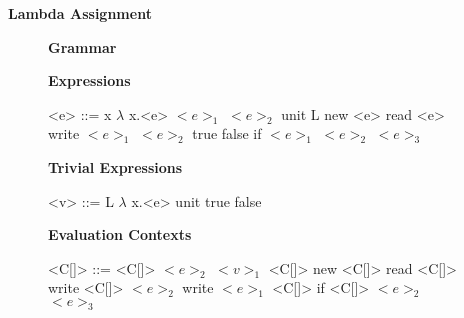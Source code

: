 \documentclass[11pt,oneside]{book}
\begin{document}
\frontmatter

\mainmatter

\pagebreak

\begin{center}
    {
        \bf
        \huge
        Lambda Assignment
    }
\end{center}

\begin{figure}[!hp]
\begin{center}
{
    \bf
    \huge
    Grammar
}
\end{center}


\setlength{\grammarindent}{10em} %

\setlength{\grammarparsep}{5pt} %

\textbf{Expressions}

\begin{grammar}

    <e> ::=  x
        \alt $\lambda$ x.<e>
        \alt $<e>_1$ $<e>_2$
        \alt unit
        \alt L
        \alt new <e>
        \alt read <e>
        \alt write $<e>_1$ $<e>_2$
        \alt true
        \alt false
        \alt if $<e>_1$ $<e>_2$ $<e>_3$

\end{grammar}

\textbf{Trivial Expressions}

\begin{grammar}

    <v> ::=  L
        \alt $\lambda$ x.<e>
        \alt unit
        \alt true
        \alt false

\end{grammar}

\textbf{Evaluation Contexts}

\begin{grammar}

    <C[\textbullet]> ::=  \textbullet
                     \alt <C[\textbullet]> $<e>_2$
                     \alt $<v>_1$ <C[\textbullet]>
                     \alt new <C[\textbullet]>
                     \alt read <C[\textbullet]>
                     \alt write <C[\textbullet]> $<e>_2$
                     \alt write $<e>_1$ <C[\textbullet]>
                     \alt if <C[\textbullet]> $<e>_2$ $<e>_3$

\end{grammar}

\end{figure}
\end{document}
